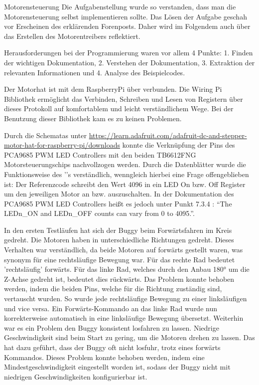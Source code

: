 \documentclass[12pt]{report}
\begin{document}
\begin{section}{Motorensteuerung}
  Die Aufgabenstellung wurde so verstanden, dass man die Motorensteuerung
  selbst implementieren sollte. Das Lösen der Aufgabe geschah vor Erscheinen des
  erklärenden Forenposts. Daher wird im Folgendem auch über das Erstellen des
  Motorentreibers reflektiert.

  Herausforderungen bei der Programmierung waren vor allem 4 Punkte: 1. Finden der wichtigen
  Dokumentation, 2. Verstehen der Dokumentation, 3. Extraktion der relevanten
  Informationen und 4. Analyse des Beispielcodes.

  Der Motorhat ist mit dem RaspberryPi über \itoc{} verbunden. Die
  Wiring Pi Bibliothek ermöglicht das Verbinden, Schreiben und Lesen von
  Registern über dieses Protokoll auf komfortablem und leicht verständlichem Wege.
  Bei der Benutzung dieser Bibliothek kam es zu keinen Problemen.
  
  Durch die Schematas unter
  \url{https://learn.adafruit.com/adafruit-dc-and-stepper-motor-hat-for-raspberry-pi/downloads}
  konnte die Verknüpfung der Pins des PCA9685 PWM LED Controllers mit den beiden
  TB6612FNG Motorsteuerungschips nachvollzogen werden.
  Durch die Datenblätter wurde die Funktionsweise des ''s
  verständlich, wenngleich hierbei eine Frage offengeblieben ist:
  Der Referenzcode schreibt den Wert 4096 in ein LED On bzw. Off Register um den
  jeweiligen Motor an bzw. auszuschalten. In der Dokumentation des PCA9685 PWM LED
  Controllers heißt es jedoch unter Punkt 7.3.4 : ``The LEDn\_ON and LEDn\_OFF
  counts can vary from 0 to 4095.''.

  In den ersten Testläufen hat sich der Buggy beim Forwärtsfahren im Kreis
  gedreht. Die Motoren haben in unterschiedliche Richtungen gedreht. Dieses
  Verhalten war verständlich, da beide Motoren auf forwärts gestellt waren, was
  synonym für eine rechtsläufige Bewegung war. Für das rechte Rad bedeutet
  'rechtsläufig' forwärts. Für das linke Rad, welches durch den Anbau 
  \ang{180} um die Z-Achse gedreht ist, bedeutet dies rückwärts.
  Das Problem konnte behoben werden, indem die beiden Pins, welche für die Richtung
  zuständig sind, vertauscht wurden. So wurde jede rechtsläufige Bewegung zu einer
  linksläufigen und vice versa. Ein Forwärts-Kommando an das linke Rad wurde nun
  korrekterweise automatisch in eine linksläufige Bewegung übersetzt.
  Weiterhin war es ein Problem den Buggy konsistent losfahren zu lassen. Niedrige 
  Geschwindigkeit sind beim Start zu gering, um die Motoren drehen zu
  lassen. Das hat dazu geführt, dass der Buggy oft nicht losfuhr, trotz eines
  forwärts Kommandos. Dieses Problem konnte behoben werden, indem eine Mindestgeschwindigkeit
  eingestellt worden ist, sodass der Buggy nicht mit niedrigen Geschwindigkeiten
  konfigurierbar ist.


\end{section}
\end{document}
